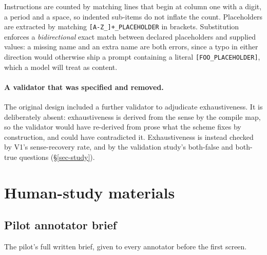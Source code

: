 Instructions are counted by matching lines that begin at column one with a digit, a period and a space, so indented
sub-items do not inflate the count. Placeholders are extracted by matching \verb|[A-Z_]+_PLACEHOLDER| in brackets.
Substitution enforces a \emph{bidirectional} exact match between declared placeholders and supplied values: a missing
name and an extra name are both errors, since a typo in either direction would otherwise ship a prompt containing a
literal \verb|[FOO_PLACEHOLDER]|, which a model will treat as content.

\paragraph{A validator that was specified and removed.}\label{app-removed-validator} The original design included a further validator to adjudicate
exhaustiveness. It is deliberately absent: exhaustiveness is derived from the sense by the compile map, so the validator
would have re-derived from prose what the scheme fixes by construction, and could have contradicted it. Exhaustiveness is
instead checked by V1's sense-recovery rate, and by the validation study's both-false and both-true questions
(\S\ref{sec-study}).

\section{Human-study materials}
\label{app-human}

\subsection{Pilot annotator brief}
\label{app-pilot-brief}
The pilot's full written brief, given to every annotator before the first screen.

